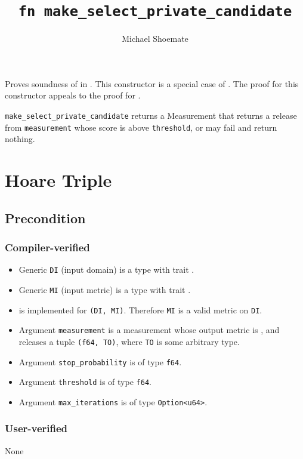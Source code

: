 \documentclass{article}
\title{\texttt{fn make\_select\_private\_candidate}}
\author{Michael Shoemate}
\date{}
\begin{document}
\maketitle

\contrib
Proves soundness of  in .
This constructor is a special case of .
The proof for this constructor appeals to the proof for .

\texttt{make\_select\_private\_candidate} returns a Measurement that returns a release from \texttt{measurement} whose score is above \texttt{threshold},
or may fail and return nothing.

\section{Hoare Triple}
\subsection*{Precondition}
\subsubsection*{Compiler-verified}
\begin{itemize}
    \item Generic \texttt{DI} (input domain) is a type with trait . 
    \item Generic \texttt{MI} (input metric) is a type with trait . 
    \item {} is implemented for \texttt{(DI, MI)}. Therefore \texttt{MI} is a valid metric on \texttt{DI}.
    \item Argument \texttt{measurement} is a measurement whose output metric is , and releases a tuple \texttt{(f64, TO)}, where \texttt{TO} is some arbitrary type.
    \item Argument \texttt{stop\_probability} is of type \texttt{f64}.
    \item Argument \texttt{threshold} is of type \texttt{f64}.
    \item Argument \texttt{max\_iterations} is of type \texttt{Option<u64>}.
\end{itemize}

\subsubsection*{User-verified}
None
\end{document}
